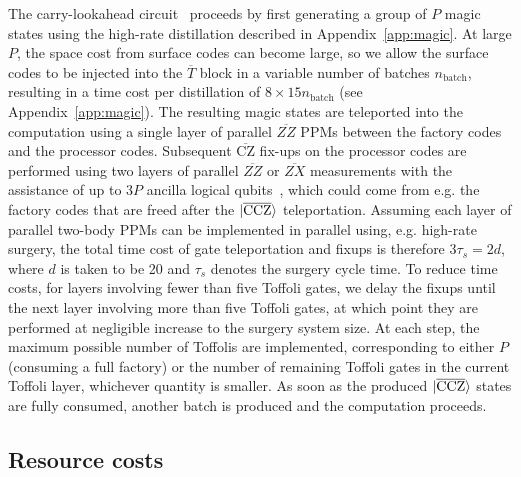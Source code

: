 \documentclass[reprint,twocolumn,secnumarabic,amssymb, aps, prx]{revtex4-2}
\newcommand{\taus}{\tau_s}
\newcommand{\ccz}{\ket{\overline{\text{CCZ}}}}
\begin{document}
The carry-lookahead circuit~\cite{draper2004logarithmic} proceeds by first generating a group of $P$ magic states using the high-rate distillation described in Appendix~\ref{app:magic}. 
At large $P$, the space cost from surface codes can become large, so we allow the surface codes to be injected into the $\overline{T}$ block in a variable number of batches $n_\text{batch}$, resulting in a time cost per distillation of $8\times15n_\text{batch}$ (see Appendix~\ref{app:magic}). The resulting magic states are teleported into the computation using a single layer of parallel $\overline{ZZ}$ PPMs between the factory codes and the processor codes.
Subsequent $\overline{\text{CZ}}$ fix-ups on the processor codes are performed using two layers of parallel $\overline{ZZ}$ or $\overline{ZX}$ measurements with the assistance of up to $3P$ ancilla logical qubits~\cite{horsman2012surface}, which could come from e.g. the factory codes that are freed after the $\ccz$ teleportation.
%
Assuming each layer of parallel two-body PPMs can be implemented in parallel using, e.g. high-rate surgery, the total time cost of gate teleportation and fixups is therefore $3\taus = 2d$, where $d$ is taken to be 20 and $\taus$ denotes the surgery cycle time.
%
To reduce time costs, for layers involving fewer than five Toffoli gates, we delay the fixups until the next layer involving more than five Toffoli gates, at which point they are performed at negligible increase to the surgery system size.
% 
At each step, the maximum possible number of Toffolis are implemented, corresponding to either $P$ (consuming a full factory) or the number of remaining Toffoli gates in the current Toffoli layer, whichever quantity is smaller. As soon as the produced $\ccz$ states are fully consumed, another batch is produced and the computation proceeds. 

\subsection{Resource costs\label{app:time_efficient_resource}}
\end{document}
